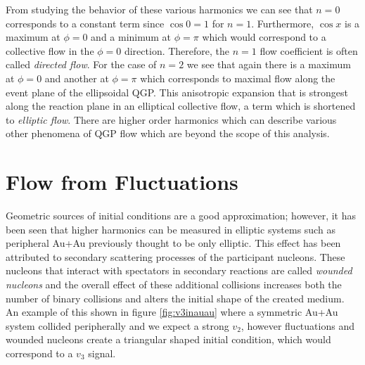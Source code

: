 From studying the behavior of these various harmonics we can see that $n=0$ corresponds to a constant term since $\cos{0} = 1$ for $n=1$. Furthermore, $\cos{x}$ is a maximum at $\phi=0$ and a minimum at $\phi = \pi$ which would correspond to a collective flow in the $\phi=0$ direction. Therefore, the $n=1$ flow coefficient is often called \textit{directed flow}. For the case of $n=2$ we see that again there is a maximum at $\phi=0$ and another at $\phi=\pi$ which corresponds to maximal flow along the event plane of the ellipsoidal QGP. This anisotropic expansion that is strongest along the reaction plane in an elliptical collective flow, a term which is shortened to \textit{elliptic flow}. There are higher order harmonics which can describe various other phenomena of QGP flow which are beyond the scope of this analysis.

\section{Flow from Fluctuations}
Geometric sources of initial conditions are a good approximation; however, it has been seen that higher harmonics can be measured in elliptic systems such as peripheral Au+Au previously thought to be only elliptic\citep{Alver:2010gr}. This effect has been attributed to secondary scattering processes of the participant nucleons. These nucleons that interact with spectators in secondary reactions are called \textit{wounded nucleons} and the overall effect of these additional collisions increases both the number of binary collisions and alters the initial shape of the created medium. An example of this shown in figure \ref{fig:v3inauau} where a symmetric Au+Au system collided peripherally and we expect a strong $v_2$, however fluctuations and wounded nucleons create a triangular shaped initial condition, which would correspond to a $v_3$ signal.

